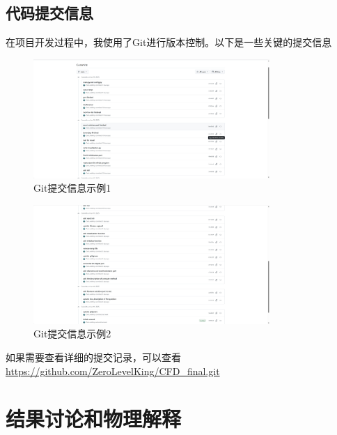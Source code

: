 \documentclass[UTF8]{ctexart}
\begin{document}
\subsection{代码提交信息}
在项目开发过程中，我使用了Git进行版本控制。以下是一些关键的提交信息
\begin{figure}[H]
    \centering
    \includegraphics[width=0.8\textwidth]{c1.png}
    \caption{Git提交信息示例1}
    \label{fig:git_commit_info1}
\end{figure}
\begin{figure}
    \centering
    \includegraphics[width=0.8\textwidth]{c2.png}
    \caption{Git提交信息示例2}
    \label{fig:git_commit_info2}
\end{figure}
如果需要查看详细的提交记录，可以查看 \url{https://github.com/ZeroLevelKing/CFD_final.git}


\newpage
\section{结果讨论和物理解释}
\end{document}
